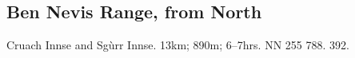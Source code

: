 


\subsection{Ben Nevis Range, from North}

\begin{munros}
\item
Cruach Innse and Sgùrr Innse.   13km; 890m; 6--7hrs.  NN 255 788.  392.
\end{munros}
